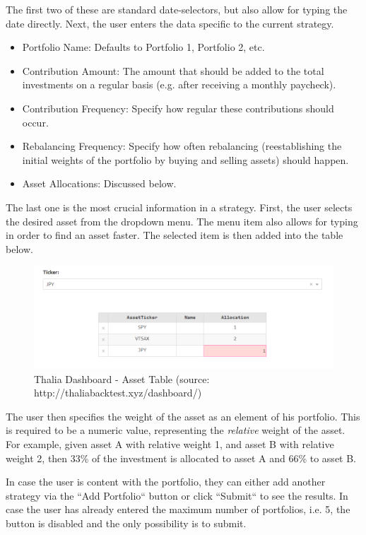 \documentclass[main.tex]{subfiles}
\begin{document}
The first two of these are standard date-selectors, but also allow for typing the date directly. Next, the user enters the data specific to the current strategy.

\begin{itemize}
    \item Portfolio Name: Defaults to Portfolio 1, Portfolio 2, etc. 
    \item Contribution Amount: The amount that should be added to the total investments on a regular basis (e.g. after receiving a monthly paycheck).
    \item Contribution Frequency: Specify how regular these contributions should occur.
    \item Rebalancing Frequency: Specify how often rebalancing (reestablishing the initial weights of the portfolio by buying and selling assets) should happen. 
    \item Asset Allocations: Discussed below.
\end{itemize}

The last one is the most crucial information in a strategy. First, the user selects the desired asset from the dropdown menu. The menu item also allows for typing in order to find an asset faster. The selected item is then added into the table below.

\begin{figure}[H]
   \centering
   \includegraphics[width=\textwidth]{08Appendices/081User/081Pictures/table.png}
   \caption{Thalia Dashboard - Asset Table (source: http://thaliabacktest.xyz/dashboard/)}
   \label{thalia_table}
\end{figure}


The user then specifies the weight of the asset as an element of his portfolio. This is required to be a numeric value, representing the \textit{relative} weight of the asset. For example, given asset A with relative weight 1, and asset B with relative weight 2, then 33\% of the investment is allocated to asset A and 66\% to asset B.

In case the user is content with the portfolio, they can either add another strategy via the ``Add Portfolio`` button or click ``Submit`` to see the results. In case the user has already entered the maximum number of portfolios, i.e. 5, the button is disabled and the only possibility is to submit.
\end{document}
